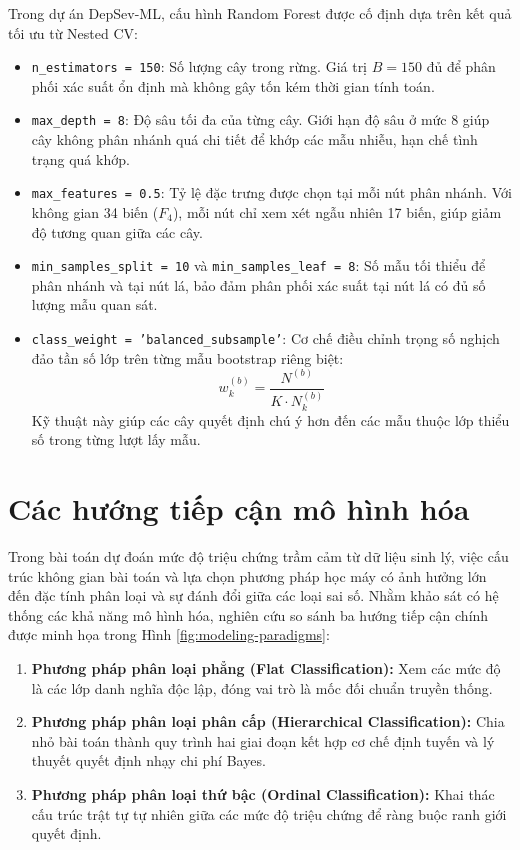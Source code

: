 Trong dự án DepSev-ML, cấu hình Random Forest được cố định dựa trên kết quả tối ưu từ Nested CV:
\begin{itemize}
    \item \texttt{n\_estimators = 150}: Số lượng cây trong rừng. Giá trị $B = 150$ đủ để phân phối xác suất ổn định mà không gây tốn kém thời gian tính toán.
    \item \texttt{max\_depth = 8}: Độ sâu tối đa của từng cây. Giới hạn độ sâu ở mức 8 giúp cây không phân nhánh quá chi tiết để khớp các mẫu nhiễu, hạn chế tình trạng quá khớp.
    \item \texttt{max\_features = 0.5}: Tỷ lệ đặc trưng được chọn tại mỗi nút phân nhánh. Với không gian 34 biến ($F_4$), mỗi nút chỉ xem xét ngẫu nhiên 17 biến, giúp giảm độ tương quan giữa các cây.
    \item \texttt{min\_samples\_split = 10} và \texttt{min\_samples\_leaf = 8}: Số mẫu tối thiểu để phân nhánh và tại nút lá, bảo đảm phân phối xác suất tại nút lá có đủ số lượng mẫu quan sát.
    \item \texttt{class\_weight = 'balanced\_subsample'}: Cơ chế điều chỉnh trọng số nghịch đảo tần số lớp trên từng mẫu bootstrap riêng biệt:
    \begin{equation}
        w_k^{(b)} = \frac{N^{(b)}}{K \cdot N_k^{(b)}}
    \end{equation}
    Kỹ thuật này giúp các cây quyết định chú ý hơn đến các mẫu thuộc lớp thiểu số trong từng lượt lấy mẫu.
\end{itemize}

\section{Các hướng tiếp cận mô hình hóa}
\label{sec:truong-phai-mo-hinh-hoa}

Trong bài toán dự đoán mức độ triệu chứng trầm cảm từ dữ liệu sinh lý, việc cấu trúc không gian bài toán và lựa chọn phương pháp học máy có ảnh hưởng lớn đến đặc tính phân loại và sự đánh đổi giữa các loại sai số. Nhằm khảo sát có hệ thống các khả năng mô hình hóa, nghiên cứu so sánh ba hướng tiếp cận chính được minh họa trong Hình \ref{fig:modeling-paradigms}:
\begin{enumerate}
    \item \textbf{Phương pháp phân loại phẳng (Flat Classification):} Xem các mức độ là các lớp danh nghĩa độc lập, đóng vai trò là mốc đối chuẩn truyền thống.
    \item \textbf{Phương pháp phân loại phân cấp (Hierarchical Classification):} Chia nhỏ bài toán thành quy trình hai giai đoạn kết hợp cơ chế định tuyến và lý thuyết quyết định nhạy chi phí Bayes.
    \item \textbf{Phương pháp phân loại thứ bậc (Ordinal Classification):} Khai thác cấu trúc trật tự tự nhiên giữa các mức độ triệu chứng để ràng buộc ranh giới quyết định.
\end{enumerate}

